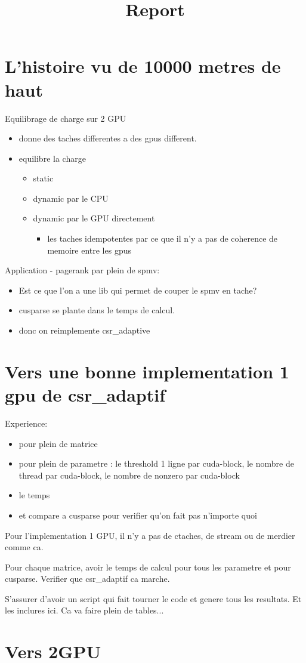 \documentclass{article}
\title{Report}
\begin{document}
\maketitle

\section{L'histoire vu de 10000 metres de haut}

Equilibrage de charge sur 2 GPU
\begin{itemize}
\item donne des taches differentes a des gpus different.
\item equilibre la charge
  \begin{itemize}
  \item static
  \item dynamic par le CPU
  \item dynamic par le GPU directement
    \begin{itemize}
    \item les taches idempotentes par ce que il n'y a pas de coherence
      de memoire entre les gpus
    \end{itemize}
  \end{itemize}
\end{itemize}

Application - pagerank par plein de spmv:
\begin{itemize}
\item Est ce que l'on a une lib qui permet de couper le spmv en tache?
\item cusparse se plante dans le temps de calcul.
\item donc on reimplemente csr\_adaptive
\end{itemize}

\section{Vers une bonne implementation 1 gpu de csr\_adaptif}

Experience:
\begin{itemize}
\item pour plein de matrice
\item pour plein de parametre : le threshold 1 ligne par cuda-block, le nombre de thread par cuda-block, le nombre de nonzero par cuda-block
\item le temps
\item et compare a cusparse pour verifier qu'on fait pas n'importe quoi
\end{itemize}

Pour l'implementation 1 GPU, il n'y a pas de ctaches, de stream ou de
merdier comme ca.

Pour chaque matrice, avoir le temps de calcul pour tous les parametre
et pour cusparse. Verifier que csr\_adaptif ca marche. 

S'assurer d'avoir un script qui fait tourner le code et genere tous
les resultats. Et les inclures ici. Ca va faire plein de tables...

\section{Vers 2GPU}
\end{document}
